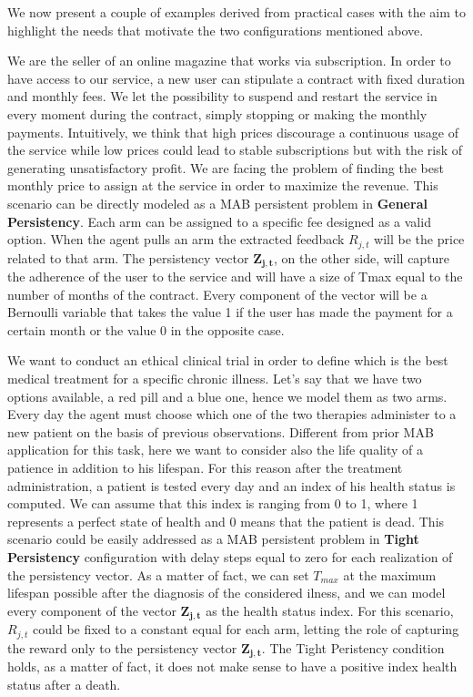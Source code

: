We now present a couple of examples derived from practical cases with the aim to highlight the needs that motivate the two configurations mentioned above. 
\begin{example}
	We are the seller of an online magazine that works via subscription. In order to have access to our service, a new user can stipulate a contract with fixed duration and monthly fees. We let the possibility to suspend and restart the service in every moment during the contract, simply stopping or making the monthly payments. Intuitively, we think that high prices discourage a continuous usage of the service while low prices could lead to stable subscriptions but with the risk of generating unsatisfactory profit. We are facing the problem of finding the best monthly price to assign at the service in order to maximize the revenue. This scenario can be directly modeled as a MAB persistent problem in \textbf{General Persistency}. Each arm can be assigned to a specific fee designed as a valid option. When the agent pulls an arm the extracted feedback $R_{j,t}$ will be the price related to that arm. The persistency vector $\boldsymbol{Z_{j,t}}$, on the other side, will capture the adherence of the user to the service and will have a size of Tmax equal to the number of months of the contract. Every component of the vector will be a Bernoulli variable that takes the value 1 if the user has made the payment for a certain month or the value 0 in the opposite case.
	\label{magazine}
\end{example}
\begin{example}
	\label{trial}
	We want to conduct an ethical clinical trial in order to define which is the best medical treatment for a specific chronic illness. Let's say that we have two options available, a red pill and a blue one, hence we model them as two arms. Every day the agent must choose which one of the two therapies administer to a new patient on the basis of previous observations. Different from prior MAB application for this task, here we want to consider also the life quality of a patience in addition to his lifespan. For this reason after the treatment administration, a patient is tested every day and an index of his health status is computed. We can assume that this index is ranging from 0 to 1, where 1 represents a perfect state of health and 0 means that the patient is dead. This scenario could be easily addressed as a MAB persistent problem in \textbf{Tight Persistency} configuration with delay steps equal to zero for each realization of the persistency vector. As a matter of fact, we can set $T_{max}$ at the maximum lifespan possible after the diagnosis of the considered ilness, and we can model every component of the vector $\boldsymbol{ Z_ {j, t}} $ as the health status index. For this scenario, $R_{j,t}$ could be fixed to a constant equal for each arm, letting the role of capturing the reward only to the persistency vector $\boldsymbol{ Z_ {j, t}}$. The Tight Peristency condition holds, as a matter of fact, it does not make sense to have a positive index health status after a death. 
\end{example}

